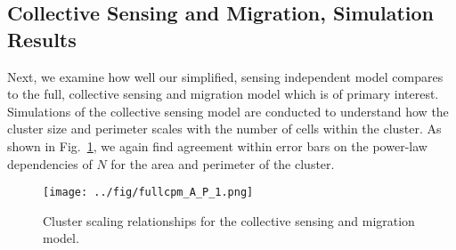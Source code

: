 \documentclass[phys,prelim]{puthesis}
\begin{document}
\subsection{Collective Sensing and Migration, Simulation Results}

Next, we examine how well our simplified, sensing independent model compares to the full, collective sensing and migration model which is of primary interest. Simulations of the collective sensing model are conducted to understand how the cluster size and perimeter scales with the number of cells within the cluster. As shown in Fig.\ \ref{fig:fullGeo}, we again find agreement within error bars on the power-law dependencies of $N$ for the area and perimeter of the cluster.

\begin{figure}[ht]
    \centering
        \texttt{[image: ../fig/fullcpm\_A\_P\_1.png]}
    \caption{Cluster scaling relationships for the collective sensing and migration model.} \label{fig:fullGeo}
\end{figure}
\end{document}
